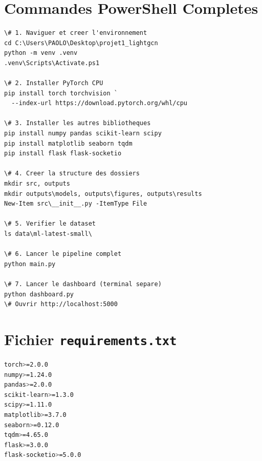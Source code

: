 \documentclass[12pt,a4paper]{report}
\begin{document}
\appendix
\chapter{Commandes PowerShell Completes}

\begin{cmdbox}
\begin{verbatim}
\# 1. Naviguer et creer l'environnement
cd C:\Users\PAOLO\Desktop\projet1_lightgcn
python -m venv .venv
.venv\Scripts\Activate.ps1

\# 2. Installer PyTorch CPU
pip install torch torchvision `
  --index-url https://download.pytorch.org/whl/cpu

\# 3. Installer les autres bibliotheques
pip install numpy pandas scikit-learn scipy
pip install matplotlib seaborn tqdm
pip install flask flask-socketio

\# 4. Creer la structure des dossiers
mkdir src, outputs
mkdir outputs\models, outputs\figures, outputs\results
New-Item src\__init__.py -ItemType File

\# 5. Verifier le dataset
ls data\ml-latest-small\

\# 6. Lancer le pipeline complet
python main.py

\# 7. Lancer le dashboard (terminal separe)
python dashboard.py
\# Ouvrir http://localhost:5000
\end{verbatim}
\end{cmdbox}

\chapter{Fichier \texttt{requirements.txt}}

\begin{lstlisting}[language=bash,numbers=none,
  caption={requirements.txt -- Dependances Projet 1}]
torch>=2.0.0
numpy>=1.24.0
pandas>=2.0.0
scikit-learn>=1.3.0
scipy>=1.11.0
matplotlib>=3.7.0
seaborn>=0.12.0
tqdm>=4.65.0
flask>=3.0.0
flask-socketio>=5.0.0
\end{lstlisting}
\end{document}
